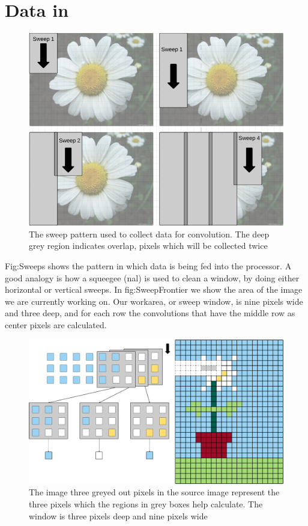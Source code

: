 \section{Data in}
\begin{figure}[h!]
    \includegraphics[width=\linewidth]{img/Sweeps.png}
    \caption{The sweep pattern used to collect data for convolution. The deep grey region indicates overlap, pixels which will be collected twice}
    \label{fig:Sweeps}
\end{figure}
Fig:Sweeps shows the pattern in which data is being fed into the processor.
A good analogy is how a squeegee (nal) is used to clean a window, by doing either horizontal or vertical sweeps.
In fig:SweepFrontier we show the area of the image we are currently working on.
Our workarea, or sweep window, is nine pixels wide and three deep, and for each row the convolutions that have the middle row as center pixels are calculated.
\begin{figure}[h!]
    \includegraphics[width=\linewidth]{img/FeedPattern.png}
    \caption{The image three greyed out pixels in the source image represent the three pixels which the regions in grey boxes help calculate. The window is three pixels deep and nine pixels wide}
    \label{fig:SweepFrontier}
\end{figure}

